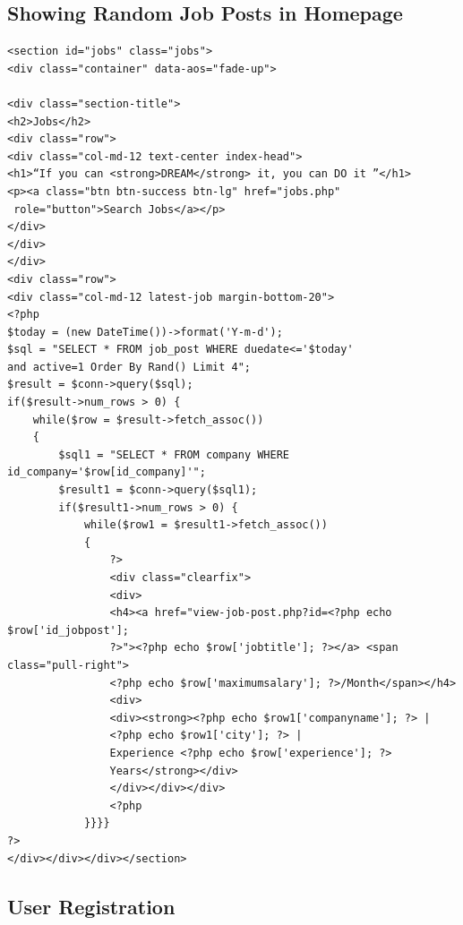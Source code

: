 \documentclass[a4paper,12pt]{report}
\begin{document}
\subsection{Showing Random Job Posts in Homepage}

\begin{verbatim}
<section id="jobs" class="jobs">
<div class="container" data-aos="fade-up">

<div class="section-title">
<h2>Jobs</h2>
<div class="row">
<div class="col-md-12 text-center index-head">
<h1>“If you can <strong>DREAM</strong> it, you can DO it ”</h1>
<p><a class="btn btn-success btn-lg" href="jobs.php"
 role="button">Search Jobs</a></p>
</div>
</div>
</div>
<div class="row">
<div class="col-md-12 latest-job margin-bottom-20">
<?php 
$today = (new DateTime())->format('Y-m-d');
$sql = "SELECT * FROM job_post WHERE duedate<='$today'
and active=1 Order By Rand() Limit 4";
$result = $conn->query($sql);
if($result->num_rows > 0) {
	while($row = $result->fetch_assoc()) 
	{
		$sql1 = "SELECT * FROM company WHERE id_company='$row[id_company]'";
		$result1 = $conn->query($sql1);
		if($result1->num_rows > 0) {
			while($row1 = $result1->fetch_assoc()) 
			{
				?>
				<div class="clearfix">
				<div>
				<h4><a href="view-job-post.php?id=<?php echo $row['id_jobpost'];
				?>"><?php echo $row['jobtitle']; ?></a> <span class="pull-right">
				<?php echo $row['maximumsalary']; ?>/Month</span></h4>
				<div>
				<div><strong><?php echo $row1['companyname']; ?> | 
				<?php echo $row1['city']; ?> | 
				Experience <?php echo $row['experience']; ?> 
				Years</strong></div>
				</div></div></div>
				<?php
			}}}}
?>
</div></div></div></section>

\end{verbatim}

\subsection{User Registration}
\end{document}
